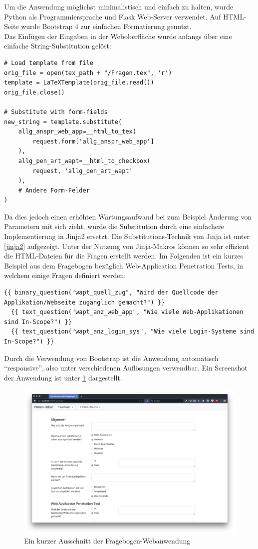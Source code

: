 Um die Anwendung möglichst minimalistisch und einfach zu halten, wurde Python als Programmiersprache und Flask Web-Server verwendet. Auf HTML-Seite wurde Bootstrap 4 zur einfachen Formatierung genutzt.\\

Das Einfügen der Eingaben in der Weboberfläche wurde anfangs über eine einfache String-Substitution gelöst:
\lstset{language=Python}
\begin{lstlisting}
# Load template from file
orig_file = open(tex_path + "/Fragen.tex", 'r')
template = LaTeXTemplate(orig_file.read())
orig_file.close()

# Substitute with form-fields
new_string = template.substitute(
    allg_anspr_web_app=__html_to_tex(
        request.form['allg_anspr_web_app']
    ),
    allg_pen_art_wapt=__html_to_checkbox(
        request, 'allg_pen_art_wapt'
    ),
    # Andere Form-Felder
)
\end{lstlisting}

Da dies jedoch einen erhöhten Wartungsaufwand bei zum Beispiel Änderung von Parametern mit sich zieht, wurde die Substitution durch eine einfachere Implementierung in Jinja2 ersetzt. Die Substitutions-Technik von Jinja ist unter \ref{jinja2} aufgezeigt. Unter der Nutzung von Jinja-Makros können so sehr effizient die HTML-Dateien für die Fragen erstellt werden. Im Folgenden ist ein kurzes Beispiel aus dem Fragebogen bezüglich Web-Application Penetration Tests, in welchem einige Fragen definiert werden:
\begin{lstlisting}
{{ binary_question("wapt_quell_zug", "Wird der Quellcode der Applikation/Webseite zugänglich gemacht?") }}
  {{ text_question("wapt_anz_web_app", "Wie viele Web-Applikationen sind In-Scope?") }}
  {{ text_question("wapt_anz_login_sys", "Wie viele Login-Systeme sind In-Scope?") }}
\end{lstlisting} 

Durch die Verwendung von Bootstrap ist die Anwendung automatisch "`responsive"', also unter verschiedenen Auflösungen verwendbar. Ein Screenshot der Anwendung ist unter \ref{fig:FragWeb} dargestellt.

\begin{figure}[htbp]
	\centering
	\includegraphics[width=\textwidth]{bilder/pentest_prozesse/vorbereitung/fragebogen_web.png}
	\caption{Ein kurzer Ausschnitt der Fragebogen-Webanwendung}
	\label{fig:FragWeb}
\end{figure}

